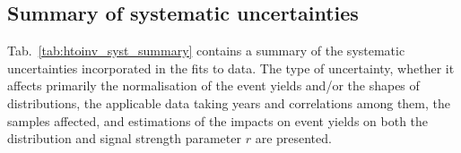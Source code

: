 

\subsection{Summary of systematic uncertainties}
\label{subsec:htoinv_syst_summary}

Tab.~\ref{tab:htoinv_syst_summary} contains a summary of the systematic uncertainties incorporated in the fits to data. The type of uncertainty, whether it affects primarily the normalisation of the event yields and/or the shapes of distributions, the applicable data taking years and correlations among them, the samples affected, and estimations of the impacts on event yields on both the \ptmiss distribution and signal strength parameter $r$ are presented.

